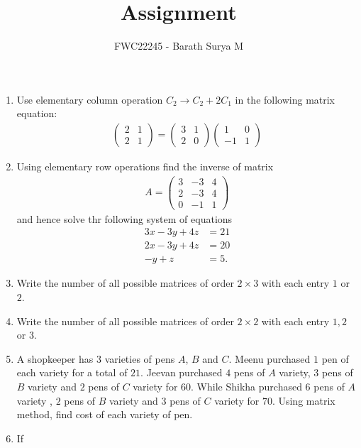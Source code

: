 \documentclass[12pt,-letter paper]{article}
\theoremstyle{remark}
\newcommand{\myvec}[1]{\ensuremath{\begin{pmatrix}#1\end{pmatrix}}}
\begin{document}
\vspace{3cm}

\title{Assignment}
\author{FWC22245 - Barath Surya M}
\maketitle
\begin{enumerate}
      \section{Matrices}
      \item Use elementary column operation $C_2 \rightarrow C_2 + 2C_1$ in the following matrix equation:
            \begin{align*}
                  \myvec{2 & 1 \\2&1} = \myvec{3&1 \\ 2&0} \myvec{1 & 0\\ -1 & 1}
            \end{align*}
      \item Using elementary row operations find the inverse of matrix
            \begin{align*}
                  A =\myvec{3 & -3 & 4 \\2&-3&4\\0&-1&1}
            \end{align*}
            and hence solve thr following system of equations
            \begin{align*}
                  3x-3y+4z & =21 \\
                  2x-3y+4z & =20 \\
                  -y+z     & =5.
            \end{align*}
      \item Write the number of all possible matrices of order $2\times 3$ with each entry $1$ or $2$.
      \item Write the number of all possible matrices of order $2\times2$ with each entry $1,2$ or $3$.
      \item A shopkeeper has $3$ varieties of pens $A$, $B$ and $C$. Meenu purchased $1$ pen of each variety for a total of \rupee $21$. Jeevan purchased $4$ pens of $A$ variety, $3$ pens of $B$ variety and $2$ pens of $C$ variety for \rupee $60$. While Shikha purchased $6$ pens of $A$ variety , $2$ pens of $B$ variety and $3$ pens of $C$ variety for \rupee $70$. Using matrix method, find cost of each variety of pen.
      \item If

\end{enumerate}
\end{document}
